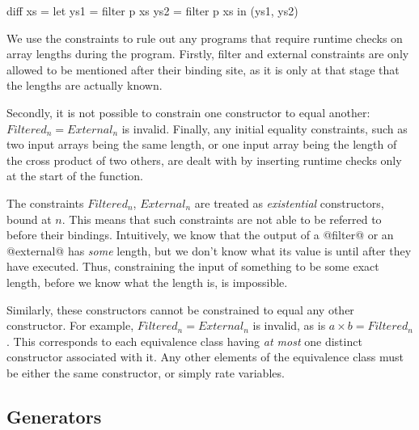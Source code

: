 \begin{code}
 diff xs = let ys1 = filter p xs
               ys2 = filter p xs
           in  (ys1, ys2)
\end{code}




We use the constraints to rule out any programs that require runtime checks on array lengths during the program. Firstly, filter and external constraints are only allowed to be mentioned after their binding site, as it is only at that stage that the lengths are actually known.


Secondly, it is not possible to constrain one constructor to equal another: $Filtered_n = External_n$ is invalid. Finally, any initial equality constraints, such as two input arrays being the same length, or one input array being the length of the cross product of two others, are dealt with by inserting runtime checks only at the start of the function.


The constraints $Filtered_n$, $External_n$ are treated as \emph{existential} constructors, bound at $n$. This means that such constraints are not able to be referred to before their bindings.
Intuitively, we know that the output of a @filter@ or an @external@ has \emph{some} length, but we don't know what its value is until after they have executed. Thus, constraining the input of something to be some exact length, before we know what the length is, is impossible.

Similarly, these constructors cannot be constrained to equal any other constructor. 
For example, $Filtered_n = External_n$ is invalid, as is $a \times b = Filtered_n$.
This corresponds to each equivalence class having \emph{at most} one distinct constructor associated with it. Any other elements of the equivalence class must be either the same constructor, or simply rate variables.

\subsection{Generators}

